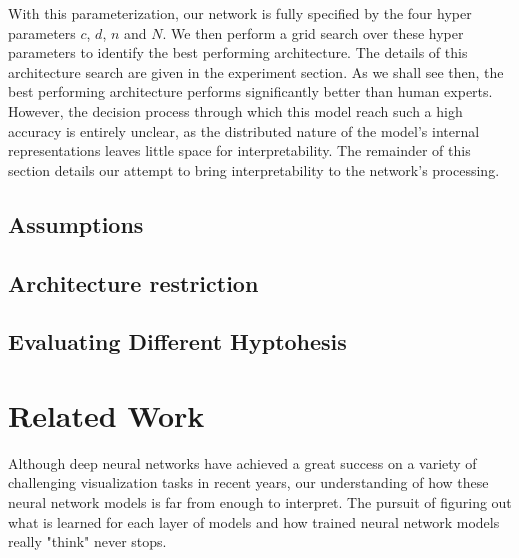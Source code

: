 \documentclass[10pt,twocolumn,letterpaper]{article}
\begin{document}
With this parameterization, our network is fully specified by the four hyper parameters $c$, $d$, $n$ and $N$.
We then perform a grid search over these hyper parameters to identify the best performing architecture.
The details of this architecture search are given in the experiment section.
As we shall see then, the best performing architecture performs significantly better than human experts.
However, the decision process through which this model reach such a high accuracy is entirely unclear,
as the distributed nature of the model's internal representations leaves little space for interpretability.
The remainder of this section details our attempt to bring interpretability to the network's processing.

\subsection{Assumptions}


\subsection{Architecture restriction}




\subsection{Evaluating Different Hyptohesis}





\section{Related Work}
Although deep neural networks have achieved a great success on a variety of challenging visualization tasks in recent years, our understanding of how these neural network models is far from enough to interpret.
The pursuit of figuring out what is learned for each layer of models and how trained neural network models really "think" never stops.
\end{document}
